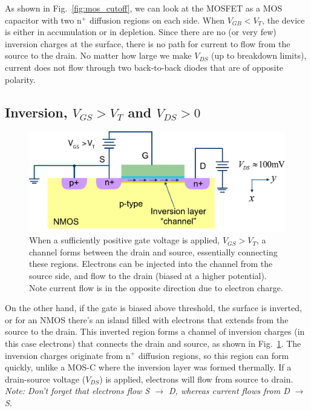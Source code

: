 As shown in Fig.~\ref{fig:mos_cutoff}, we can look at the MOSFET as a MOS capacitor with two n$^+$ diffusion regions on each side. When $V_{GB} < V_T$, the device is either in accumulation or in depletion. Since there are no (or very few) inversion charges at the surface, there is no path for current to flow from the source to the drain.  No matter how large we make $V_{DS}$ (up to breakdown limits), current does not flow through two back-to-back diodes that are of opposite polarity.



\subsection{Inversion, $V_{GS} > V_T$ and $V_{DS} > 0$}

\begin{figure}[tb]
\begin{center}
\includegraphics[width=.75\columnwidth]{mos_triode}
\end{center}
\caption{When a sufficiently positive gate voltage is applied, $V_{GS} > V_T$, a channel forms between the drain and source, essentially connecting these regions.  Electrons can be injected into the channel from the source side, and flow to the drain (biased at a higher potential).  Note current flow is in the opposite direction due to electron charge.} \label{fig:mos_triode}
\end{figure}

On the other hand, if the gate is biased above threshold, the surface is inverted, or for an NMOS there's an island filled with electrons that extends from the source to the drain.   This inverted region forms a channel of inversion charges (in this case electrons) that connects the drain and source, as shown in Fig.~\ref{fig:mos_triode}.  The inversion charges originate from n$^+$ diffusion regions, so this region can form quickly, unlike a MOS-C where the inversion layer was formed thermally. If a drain-source voltage ($V_{DS}$) is applied, electrons will flow from source to drain.  
 \textit{Note: Don't forget that electrons flow S $\rightarrow$ D, whereas current flows from D $\rightarrow$ S}.
 


